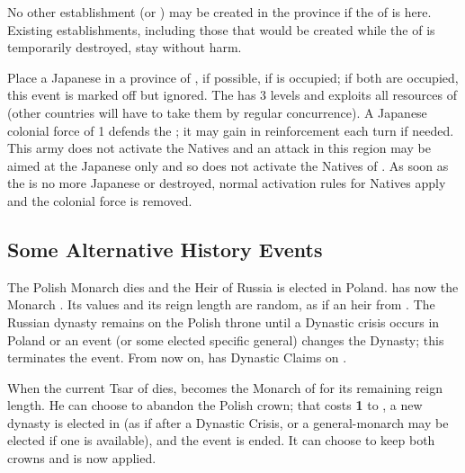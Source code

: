 \aparag No other establishment (\COL or \TP) may be created in the province if
the \TP of \paysaceh is here.
\bparag Existing establishments, including those that would be created while
the \TP of \paysaceh is temporarily destroyed, stay without harm.




\phevnt
\aparag Place a Japanese \TP in a province of \granderegionCorea,
\provinceSeoul if possible, \provincePyongyang if \provinceSeoul is occupied;
if both are occupied, this event is marked off but ignored.
\aparag The \TP has 3 levels and exploits all resources of \granderegionCorea
(other countries will have to take them by regular concurrence).
\aparag A Japanese colonial force of 1 \ARMY\faceplus defends the \TP; it may
gain \ARMY\facemoins in reinforcement each turn if needed.  This army does not
activate the Natives and an attack in this region may be aimed at the Japanese
only and so does not activate the Natives of \granderegionCorea. As soon as
the \TP is no more Japanese or destroyed, normal activation rules for Natives
apply and the colonial force is removed.



\subsection{Some Alternative History Events}





\phevnt
\aparag The Polish Monarch dies and the Heir of Russia is elected in
Poland. \POL has now the Monarch .  Its values and its reign
length are random, as if an heir from \RUS.
\aparag The Russian dynasty remains on the Polish throne until a Dynastic
crisis occurs in Poland or an event (or some elected specific general) changes
the Dynasty; this terminates the event. From now on, \RUS has Dynastic Claims
on \POL.

\activation{}
\aparag When the current Tsar of \RUS dies,  becomes the
Monarch of \RUS for its remaining reign length.
\aparag He can choose to abandon the Polish crown; that costs {\bf 1} \STAB to
\RUS, a new dynasty is elected in \POL (as if after a Dynastic Crisis, or a
general-monarch may be elected if one is available), and the event is ended.
\aparag It can choose to keep both crowns and  is now applied.

